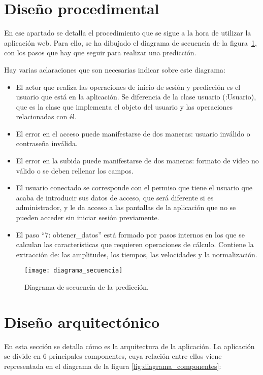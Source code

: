 \section{Diseño procedimental}
En ese apartado se detalla el procedimiento que se sigue a la hora de utilizar la aplicación web. Para ello, se ha dibujado el diagrama de secuencia de la figura~\ref{fig:diagrama_secuencia}, con los pasos que hay que seguir para realizar una predicción.

Hay varias aclaraciones que son necesarias indicar sobre este diagrama:

\begin{itemize}
	\item El actor que realiza las operaciones de inicio de sesión y predicción es el usuario que está en la aplicación. Se diferencia de la clase usuario (:Usuario), que es la clase que implementa el objeto del usuario y las operaciones relacionadas con él.
	\item El error en el acceso puede manifestarse de dos maneras: usuario inválido o contraseña inválida.
	\item El error en la subida puede manifestarse de dos maneras: formato de vídeo no válido o se deben rellenar los campos.
	\item El usuario conectado se corresponde con el permiso que tiene el usuario que acaba de introducir sus datos de acceso, que será diferente si es administrador, y le da acceso a las pantallas de la aplicación que no se pueden acceder sin iniciar sesión previamente.
	\item El paso ``7: obtener\_datos'' está formado por pasos internos en los que se calculan las características que requieren operaciones de cálculo. Contiene la extracción de: las amplitudes, los tiempos, las velocidades y la normalización.
\end{itemize}

\begin{figure}[ht]
	\texttt{[image: diagrama\_secuencia]}
	\caption{Diagrama de secuencia de la predicción.}
	\label{fig:diagrama_secuencia}
\end{figure}

\section{Diseño arquitectónico}
En esta sección se detalla cómo es la arquitectura de la aplicación. La aplicación se divide en 6 principales componentes, cuya relación entre ellos viene representada en el diagrama de la figura \ref{fig:diagrama_componentes}:

